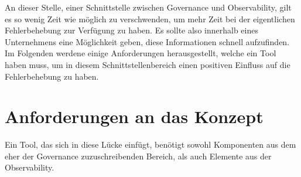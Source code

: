 An dieser Stelle, einer Schnittstelle zwischen Governance und Observability, gilt es so wenig Zeit wie möglich zu verschwenden, um mehr Zeit bei der eigentlichen Fehlerbehebung zur Verfügung zu haben. Es sollte also innerhalb eines Unternehmens eine Möglichkeit geben, diese Informationen schnell aufzufinden. Im Folgenden werdene einige Anforderungen herausgestellt, welche ein Tool haben muss, um in diesem Schnittstellenbereich einen positiven Einfluss auf die Fehlerbehebung zu haben.


\section{Anforderungen an das Konzept}\label{chap:Anforderungen}

Ein Tool, das sich in diese Lücke einfügt, benötigt sowohl Komponenten aus dem eher der Governance zuzuschreibenden Bereich, als auch Elemente aus der Observability.

